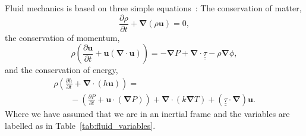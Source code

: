 Fluid mechanics is based on three simple equations~\cite{landau1959course}:
 The conservation of matter,
\begin{equation}
\frac{\partial \rho}{\partial t} + \boldsymbol{\nabla}(\rho \boldsymbol{u}) = 0,
\tag{Matter}
\label{eq:Matter}
\end{equation}
the conservation of momentum,
\begin{equation}
\rho\left (\frac{\partial \mathbf{u}}{\partial t}
+ \mathbf{u}(\boldsymbol{\nabla}\cdot \mathbf{u})\right) =
- \boldsymbol{\nabla}P + \boldsymbol{\nabla}\cdot \underline{\underline{\tau}}
- \rho\boldsymbol{\nabla}\phi,
\tag{Momentum}
\end{equation}
and the conservation of energy,
\begin{equation}
\begin{array}{l}
\rho \left( \frac{\partial h}{\partial t} + \boldsymbol{\nabla}
\cdot (h\mathbf{u})\right) = \\ \quad\quad- \left( \frac{\partial P}{\partial t}
+ \mathbf{u}\cdot (\boldsymbol{\nabla} P) \right)
+ \boldsymbol{\nabla}\cdot (k \boldsymbol{\nabla} T )
+ (\underline{\underline{\tau}}\cdot\boldsymbol{\nabla})\mathbf{u}.\end{array}
\tag{Energy}
\end{equation}
Where we have assumed that we are in an inertial frame and the variables are
labelled as in Table~\ref{tab:fluid_variables}.

